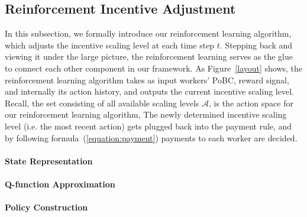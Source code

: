 \subsection{Reinforcement Incentive Adjustment}
In this subsection, we formally introduce our reinforcement learning algorithm, which adjusts the incentive scaling level at each time step $t$. Stepping back and viewing it under the large picture, the reinforcement learning serves as the glue to connect each other component in our framework. As Figure~\ref{layout} shows, the reinforcement learning algorithm takes as input workers' PoBC, reward signal, and internally its action history, and outputs the current incentive scaling level. Recall, the set consisting of all available scaling levels $\mathcal{A}$, is the action space for our reinforcement learning algorithm, The newly determined incentive scaling level (i.e. the most recent action) gets plugged back into the payment rule, and by following formula~(\ref{equation:payment}) payments to each worker are decided. 
\paragraph{State Representation}

\paragraph{Q-function Approximation}

\paragraph{Policy Construction}